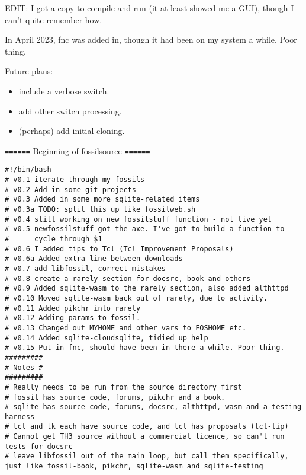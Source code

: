 \documentclass[11pt]{article}
\begin{document}
EDIT: I got a copy to compile and run (it at least showed me a GUI), though I can't quite remember how.

In April 2023, fnc was added in, though it had been on my system a while. Poor thing.

Future plans: 
\begin{itemize}
\item include a verbose switch.
\item add other switch processing.
\item (perhaps) add initial cloning.
\end{itemize}

\texttt{======} Beginning of fossilsource \texttt{======}
\begin{verbatim}
#!/bin/bash
# v0.1 iterate through my fossils
# v0.2 Add in some git projects
# v0.3 Added in some more sqlite-related items
# v0.3a TODO: split this up like fossilweb.sh
# v0.4 still working on new fossilstuff function - not live yet
# v0.5 newfossilstuff got the axe. I've got to build a function to
#      cycle through $1
# v0.6 I added tips to Tcl (Tcl Improvement Proposals)
# v0.6a Added extra line between downloads
# v0.7 add libfossil, correct mistakes
# v0.8 create a rarely section for docsrc, book and others
# v0.9 Added sqlite-wasm to the rarely section, also added althttpd
# v0.10 Moved sqlite-wasm back out of rarely, due to activity.
# v0.11 Added pikchr into rarely
# v0.12 Adding params to fossil.
# v0.13 Changed out MYHOME and other vars to FOSHOME etc.
# v0.14 Added sqlite-cloudsqlite, tidied up help
# v0.15 Put in fnc, should have been in there a while. Poor thing.
#########
# Notes #
#########
# Really needs to be run from the source directory first
# fossil has source code, forums, pikchr and a book.
# sqlite has source code, forums, docsrc, althttpd, wasm and a testing harness
# tcl and tk each have source code, and tcl has proposals (tcl-tip)
# Cannot get TH3 source without a commercial licence, so can't run tests for docsrc
# leave libfossil out of the main loop, but call them specifically, just like fossil-book, pikchr, sqlite-wasm and sqlite-testing


\end{verbatim}
\end{document}
